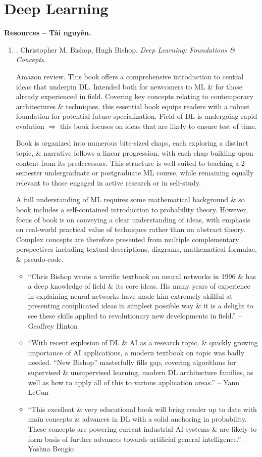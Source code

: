 \documentclass{article}
\begin{document}
\section{Deep Learning}
\textbf{\textsf{Resources -- Tài nguyên.}}
\begin{enumerate}
	\item \cite{Bishop_Bishop2024}. {\sc Christopher M. Bishop, Hugh Bishop}. {\it Deep Learning: Foundations \& Concepts}. {}
	
	{\sf Amazon review.} This book offers a comprehensive introduction to central ideas that underpin DL. Intended both for newcomers to ML \& for those already experienced in field. Covering key concepts relating to contemporary architectures \& techniques, this essential book equips readers with a robust foundation for potential future specialization. Field of DL is undergoing rapid evolution $\Rightarrow$ this book focuses on ideas that are likely to ensure test of time.
	
	Book is organized into numerous bite-sized chaps, each exploring a distinct topic, \& narrative follows a linear progression, with each chap building upon content from its predecessors. This structure is well-suited to teaching a 2-semester undergraduate or postgraduate ML course, while remaining equally relevant to those engaged in active research or in self-study.
	
	A full understanding of ML requires some mathematical background \& so book includes a self-contained introduction to probability theory. However, focus of book is on conveying a clear understanding of ideas, with emphasis on real-world practical value of techniques rather than on abstract theory. Complex concepts are therefore presented from multiple complementary perspectives including textual descriptions, diagrams, mathematical formulae, \& pseudo-code.
	\begin{itemize}
		\item ``{\sc Chris Bishop} wrote a terrific textbook on neural networks in 1996 \& has a deep knowledge of field \& its core ideas. His many years of experience in explaining neural networks have made him extremely skillful at presenting complicated ideas in simplest possible way \& it is a delight to see these skills applied to revolutionary new developments in field.'' -- {\sc Geoffrey Hinton}
		\item ``With recent explosion of DL \& AI as a research topic, \& quickly growing importance of AI applications, a modern textbook on topic was badly needed. ``New Bishop'' masterfully fills gap, covering algorithms for supervised \& unsupervised learning, modern DL architecture families, as well as how to apply all of this to various application areas.'' -- {\sc Yann LeCun}
		\item ``This excellent \& very educational book will bring reader up to date with main concepts \& advances in DL with a solid anchoring in probability. These concepts are powering current industrial AI systems \& are likely to form basis of further advances towards artificial general intelligence.'' -- {\sc Yoshua Bengio}
		

\end{itemize}
\end{enumerate}
\end{document}
